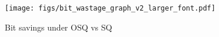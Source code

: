 \begin{figure}[h]%
\centering  
\texttt{[image: figs/bit\_wastage\_graph\_v2\_larger\_font.pdf]}
\caption{Bit savings under OSQ vs SQ}
\label{fig:bit-wastage-graph}
\end{figure}